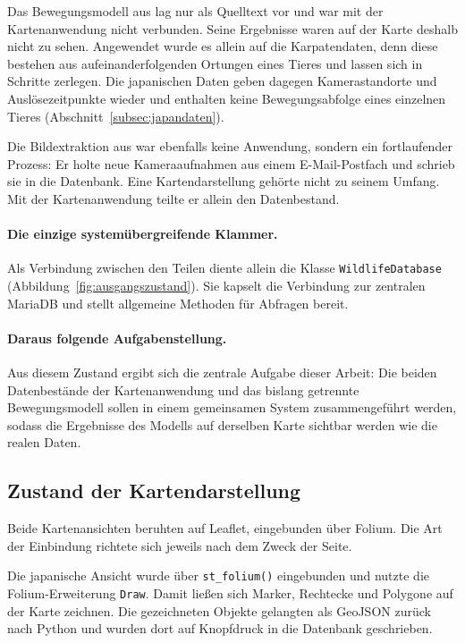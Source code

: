 \documentclass[12pt,a4paper]{report}
\begin{document}
Das Bewegungsmodell aus \cite{BreuBA} lag
nur als Quelltext vor und war mit der Kartenanwendung nicht verbunden. Seine Ergebnisse
waren auf der Karte deshalb nicht zu sehen. Angewendet wurde es allein auf die
Karpatendaten, denn diese bestehen aus aufeinanderfolgenden Ortungen eines Tieres und lassen
sich in Schritte zerlegen. Die japanischen Daten geben dagegen Kamerastandorte und
Auslösezeitpunkte wieder und enthalten keine Bewegungsabfolge eines einzelnen Tieres
(Abschnitt~\ref{subsec:japandaten}).

Die Bildextraktion aus \cite{LelchatBA} war ebenfalls keine Anwendung, sondern ein
fortlaufender Prozess: Er holte neue Kameraaufnahmen aus einem E-Mail-Postfach und schrieb
sie in die Datenbank. Eine Kartendarstellung gehörte nicht zu seinem Umfang. Mit der
Kartenanwendung teilte er allein den Datenbestand.

\paragraph{Die einzige systemübergreifende Klammer.} Als Verbindung zwischen den Teilen
diente allein die Klasse \texttt{WildlifeDatabase} (Abbildung~\ref{fig:ausgangszustand}).
Sie kapselt die Verbindung zur zentralen MariaDB und stellt allgemeine Methoden für
Abfragen bereit.

\paragraph{Daraus folgende Aufgabenstellung.} Aus diesem Zustand ergibt sich die zentrale
Aufgabe dieser Arbeit: Die beiden Datenbestände der Kartenanwendung und das bislang
getrennte Bewegungsmodell sollen in einem gemeinsamen System zusammengeführt werden, sodass
die Ergebnisse des Modells auf derselben Karte sichtbar werden wie die realen Daten.



\subsection{Zustand der Kartendarstellung}
\label{subsec:ausgangszustand-karte}

Beide Kartenansichten beruhten auf Leaflet, eingebunden über Folium. Die Art der Einbindung
richtete sich jeweils nach dem Zweck der Seite.

Die japanische Ansicht wurde über \texttt{st\_folium()} eingebunden und nutzte die
Folium-Erweiterung \texttt{Draw}. Damit ließen sich Marker, Rechtecke und Polygone auf der
Karte zeichnen. Die gezeichneten Objekte gelangten als GeoJSON zurück nach Python und wurden
dort auf Knopfdruck in die Datenbank geschrieben.
\end{document}
